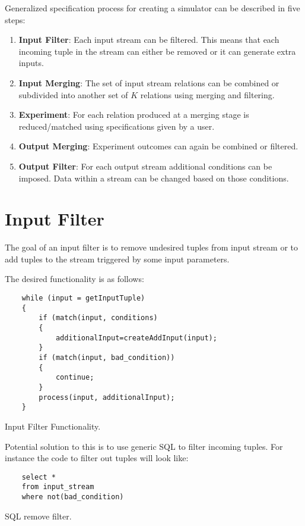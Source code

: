 \documentclass{article}
\begin{document}
Generalized specification process for creating a simulator can be described in five steps:

\begin{enumerate}
    \item {\bf Input Filter}: Each input stream can be filtered. This means that each incoming tuple in the stream can either be removed or it can generate extra inputs. 
    \item {\bf Input Merging}: The set of input stream relations can be combined or subdivided into another set of $K$ relations using merging and filtering. 
    \item {\bf Experiment}: For each relation produced at a merging stage is reduced/matched using specifications given by a user.
    \item {\bf Output Merging}: Experiment outcomes can again be combined or filtered.
    \item {\bf Output Filter}: For each output stream additional conditions can be imposed. Data within a stream can be changed based on those conditions.
\end{enumerate}

\section{Input Filter}

The goal of an input filter is to remove undesired tuples from input stream or to add tuples to the stream triggered by some input parameters.

The desired functionality is as follows:

\begin{program}
    \begin{verbatim}   
    while (input = getInputTuple)
    {
        if (match(input, conditions)
        {
            additionalInput=createAddInput(input);
        }
        if (match(input, bad_condition))
        {
            continue;
        }
        process(input, additionalInput);
    }
    \end{verbatim}
\caption{Input Filter Functionality.}
\end{program} 

Potential solution to this is to use generic SQL to filter incoming tuples. For instance the code to filter out tuples will look like:

\begin{program}
    \begin{verbatim}   
    select * 
    from input_stream
    where not(bad_condition)
    \end{verbatim}
\caption{SQL remove filter.}
\end{program}
\end{document}
